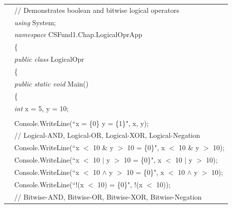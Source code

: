 \renewcommand{\baselinestretch}{0.8}
\begin{program}
\begin{tabular}{>{\codelinenumfont}l>{\codelistingfont}l}

1 & // Demonstrates boolean and bitwise logical operators \\
2 & \emph{using} System;\\
3 & \emph{namespace} CSFund1.Chap\thechapter.LogicalOprApp\\
4 & \{\\
5 &  \hspace{0.2in} \emph{public class} LogicalOpr\\
6 &  \hspace{0.2in} \{\\
7 &  \hspace{0.4in} \emph{public static void} Main()\\
8 &  \hspace{0.4in} \{\\
9 &  \hspace{0.6in} \emph{int} x = 5, y = 10;\\
10 & \\
11 &  \hspace{0.6in} Console.WriteLine(``x = \{0\}  y = \{1\}", x, y); \\

12 &  \hspace{0.6in} // Logical-AND, Logical-OR, Logical-XOR, Logical-Negation \\


13 &  \hspace{0.6in} Console.WriteLine(``x $<$ 10 \& y $>$ 10 = \{0\}", x $<$ 10 \& y $>$ 10); \\

14 &  \hspace{0.6in}  Console.WriteLine(``x $<$ 10 $\vert$ y $>$ 10 = \{0\}", x $<$ 10 $\vert$ y $>$ 10); \\


15 &  \hspace{0.6in} Console.WriteLine(``x $<$ 10 $\wedge$ y $>$ 10 = \{0\}", x $<$ 10 $\wedge$ y $>$ 10); \\

16 &  \hspace{0.6in} Console.WriteLine(``!(x $<$ 10) = \{0\}", !(x $<$ 10)); \\


17 &  \hspace{0.6in} // Bitwise-AND, Bitwise-OR, Bitwise-XOR, Bitwise-Negation\\


\end{tabular}
\end{program}
